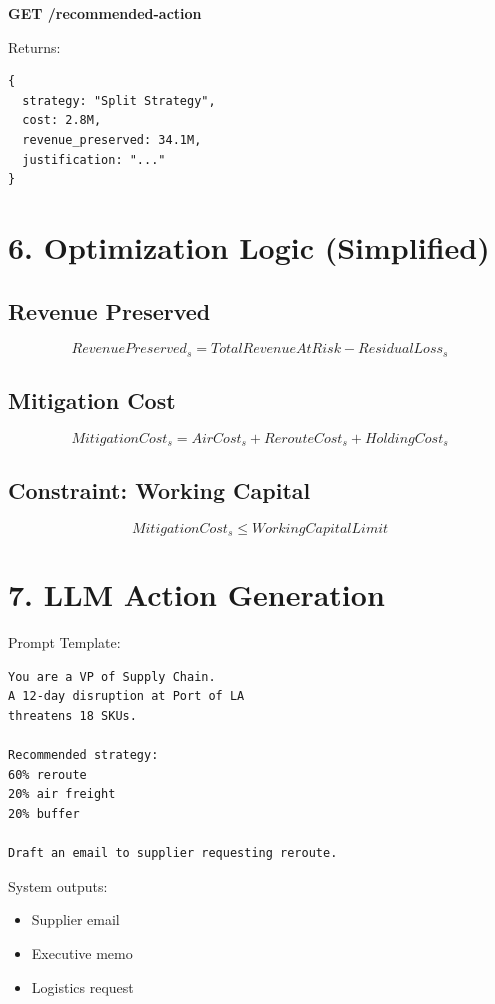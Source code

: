 \documentclass[11pt]{article}
\begin{document}
\textbf{GET /recommended-action}

Returns:

\begin{verbatim}
{
  strategy: "Split Strategy",
  cost: 2.8M,
  revenue_preserved: 34.1M,
  justification: "..."
}
\end{verbatim}

\section*{6. Optimization Logic (Simplified)}

\subsection*{Revenue Preserved}

\[
RevenuePreserved_s = TotalRevenueAtRisk - ResidualLoss_s
\]

\subsection*{Mitigation Cost}

\[
MitigationCost_s =
AirCost_s + RerouteCost_s + HoldingCost_s
\]

\subsection*{Constraint: Working Capital}

\[
MitigationCost_s \leq WorkingCapitalLimit
\]

\section*{7. LLM Action Generation}

Prompt Template:

\begin{verbatim}
You are a VP of Supply Chain.
A 12-day disruption at Port of LA
threatens 18 SKUs.

Recommended strategy:
60% reroute
20% air freight
20% buffer

Draft an email to supplier requesting reroute.
\end{verbatim}

System outputs:

\begin{itemize}
    \item Supplier email
    \item Executive memo
    \item Logistics request
\end{itemize}
\end{document}
